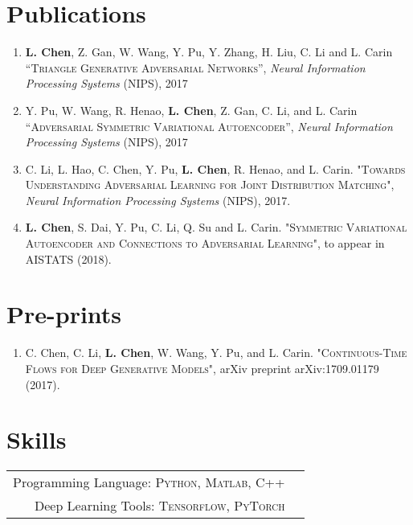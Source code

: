 \documentclass[a4paper,10pt]{article}
\begin{document}
\section{Publications}
\begin{enumerate}
    \item \textbf{L. Chen}, Z. Gan, W. Wang, Y. Pu, Y. Zhang, H. Liu, C. Li and L. Carin \textsc{“Triangle Generative
Adversarial Networks”}, \textsl{Neural Information Processing Systems} (NIPS), 2017

    \item Y. Pu, W. Wang, R. Henao, \textbf{L. Chen}, Z. Gan, C. Li, and L. Carin \textsc{“Adversarial Symmetric Variational Autoencoder”}, \textsl{Neural Information Processing Systems} (NIPS), 2017
    
    \item C. Li, L. Hao, C. Chen, Y. Pu, \textbf{L. Chen}, R. Henao, and L. Carin. \textsc{"Towards Understanding Adversarial Learning for Joint Distribution Matching"}, \textsl{Neural Information Processing Systems} (NIPS), 2017.
    \item \textbf{L. Chen}, S. Dai, Y. Pu, C. Li, Q. Su and L. Carin. \textsc{"Symmetric Variational Autoencoder and Connections to Adversarial Learning"}, to appear in AISTATS (2018).
\end{enumerate}

\section{Pre-prints}
\begin{enumerate}
    \item C. Chen, C. Li, \textbf{L. Chen}, W. Wang, Y. Pu, and L. Carin. \textsc{"Continuous-Time Flows for Deep Generative Models"}, arXiv preprint arXiv:1709.01179 (2017).
    
    
\end{enumerate}
\section{Skills}
\begin{tabular}{rl}
	Programming Language: \textsc{Python}, \textsc{Matlab}, \textsc{C++}\\
	Deep Learning Tools: \textsc{Tensorflow}, \textsc{PyTorch}
\end{tabular}

\end{document}
